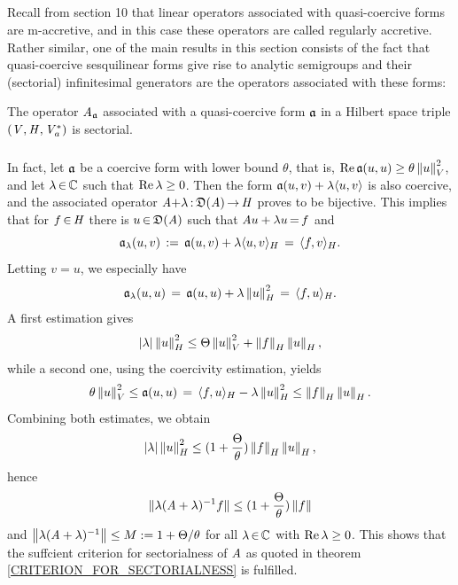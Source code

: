 \documentclass[11pt,twoside]{article}
\begin{document}
\subsection{} %
Recall from section 10
that linear operators associated with quasi-coercive forms are m-accretive,
and in this case these operators are called regularly accretive.
Rather similar,
one of the main results in this section consists of the fact
that quasi-coercive sesquilinear forms give rise to analytic semigroups
and their (sectorial) infinitesimal generators are the operators
associated with these forms:

\begin{theorem}
The operator $\mathit{A}_{\mathfrak{a}}$ associated with a quasi-coercive form $\mathfrak{a}$
in a Hilbert space triple $(\mathit{V},\mathit{H},\mathit{V}_a^*)$ is sectorial.
\end{theorem}

\subparagraph{}
In fact,
let $\mathfrak{a}$ be a coercive form with lower bound $\theta$,
that is,
$\operatorname{Re} \mathfrak{a}(u,u) \geq \theta \left\lVert u \right\rVert_V^2$,
and let $\lambda {\,\in\,} {\mathbb{C}}$ such that $\operatorname{Re} \lambda \geq 0$.
Then the form $\mathfrak{a}(u,v) + \lambda \langle u,v \rangle$ is also coercive,
and the associated operator $\mathit{A} {+} \lambda {\,:\,} \mathfrak{D}(\mathit{A}) {\,\to\,} \mathit{H}$
proves to be bijective.
This implies that for $f {\,\in\,} \mathit{H}$ there is $u {\,\in\,} \mathfrak{D}(\mathit{A})$
such that $\mathit{A} u + \lambda u {\,=\,} f$ and
\[
\mathfrak{a}_{\lambda}(u,v) \,:=\,
\mathfrak{a}(u,v) + \lambda \langle u,v \rangle_H \,=\, \langle f,v \rangle_H.
\]
Letting $v=u$, we especially have
\[
   \mathfrak{a}_{\lambda}(u,u)
\,=\, \mathfrak{a}(u,u) + \lambda \left\lVert u \right\rVert_{\mathit{H}}^2
\,=\, \langle f,u \rangle_{\mathit{H}}.
\]
A first estimation gives
\[
\abs{\lambda} \norm{u}_H^2 \leq \Theta \norm{u}_V^2 + \norm{f}_H \norm{u}_H,
\]
while a second one, using the coercivity estimation, yields
\[
\theta \left\lVert u \right\rVert_V^2 \leq \mathfrak{a}(u,u) \,=\, \langle f,u \rangle_H - \lambda \left\lVert u \right\rVert_H^2
\leq \left\lVert f \right\rVert_H \left\lVert u \right\rVert_H.
\]
Combining both estimates, we obtain
\[
\abs{\lambda} \norm{u}_H^2 \leq
(1 + \frac{\Theta}{\theta}) \norm{f}_H \norm{u}_H,
\]
hence
\[
\lVert \lambda (\mathit{A}+\lambda)^{-1}f \rVert \leq
(1 + \frac{\Theta}{\theta}) \left\lVert f \right\rVert
\]
and $\left\lVert \lambda(\mathit{A}+\lambda)^{-1} \right\rVert \leq M := 1 + \Theta/\theta$
for all $\lambda {\,\in\,} {\mathbb{C}}$ with $\operatorname{Re} \lambda \geq 0$.
This shows that the suffcient criterion for sectorialness of $\mathit{A}$
as quoted in theorem \ref{CRITERION_FOR_SECTORIALNESS} is fulfilled.

\end{document}
